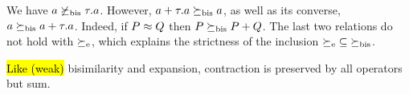 
\begin{example}
\label{exa:contr}
We have %
 $ a \not  \mathrel{\succeq_{\rm{bis}}} \tau. a$. However,
$a+ \tau . a \mathrel{\succeq_{\rm{bis}}} a$, as well as its converse, 
$  a \mathrel{\succeq_{\rm{bis}}} a +
\tau . a $. Indeed, if $P \approx Q$ then 
$  P  \mathrel{\succeq_{\rm{bis}}} P +Q$. The last two relations do not hold with 
$\mathrel{\succeq_{\rm{e}}}$, which explains the strictness of the inclusion
 ${\mathrel{\succeq_{\rm{e}}}} \subseteq {\mathrel{\succeq_{\rm{bis}}}}$. 
\end{example} 


\hl{Like (weak)} bisimilarity and expansion, contraction is preserved by all operators but sum.
